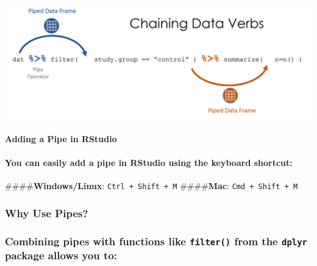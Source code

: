 \documentclass[
]{article}
\let\oldparagraph\paragraph
\renewcommand{\paragraph}[1]{\oldparagraph{#1}\mbox{}}
\begin{document}
\hypertarget{section}{%
\paragraph{\texorpdfstring{\protect\includegraphics{chaining_data_verbs.png?raw=true}}{}}\label{section}}

\hypertarget{adding-a-pipe-in-rstudio}{%
\paragraph{Adding a Pipe in RStudio}\label{adding-a-pipe-in-rstudio}}

\hypertarget{you-can-easily-add-a-pipe-in-rstudio-using-the-keyboard-shortcut}{%
\paragraph{\texorpdfstring{You can easily add a pipe in RStudio using
the \textbf{keyboard
shortcut}:}{You can easily add a pipe in RStudio using the keyboard shortcut:}}\label{you-can-easily-add-a-pipe-in-rstudio-using-the-keyboard-shortcut}}

\#\#\#\#\textbf{Windows/Linux}: \texttt{Ctrl\ +\ Shift\ +\ M}
\#\#\#\#\textbf{Mac}: \texttt{Cmd\ +\ Shift\ +\ M}

\hypertarget{why-use-pipes}{%
\subsubsection{Why Use Pipes?}\label{why-use-pipes}}

\hypertarget{combining-pipes-with-functions-like-filter-from-the-dplyr-package-allows-you-to}{%
\subsubsection{\texorpdfstring{Combining pipes with functions like
\texttt{filter()} from the \texttt{dplyr} package allows you
to:}{Combining pipes with functions like filter() from the dplyr package allows you to:}}\label{combining-pipes-with-functions-like-filter-from-the-dplyr-package-allows-you-to}}
\end{document}

